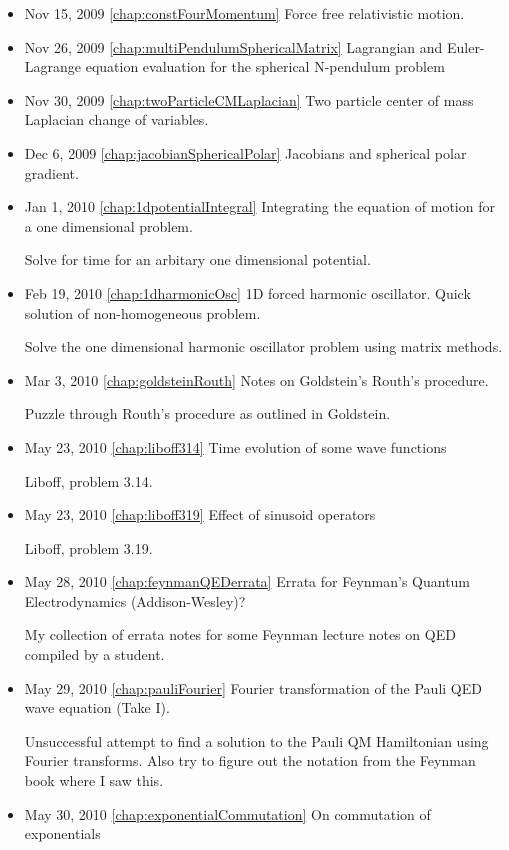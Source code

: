 \begin{itemize}
\item Nov 15, 2009 \ref{chap:constFourMomentum} Force free relativistic motion.

\item Nov 26, 2009 \ref{chap:multiPendulumSphericalMatrix} Lagrangian and Euler-Lagrange equation evaluation for the spherical N-pendulum problem

\item Nov 30, 2009 \ref{chap:twoParticleCMLaplacian} Two particle center of mass Laplacian change of variables.

\item Dec 6, 2009 \ref{chap:jacobianSphericalPolar} Jacobians and spherical polar gradient.

\item Jan 1, 2010 \ref{chap:1dpotentialIntegral} Integrating the equation of motion for a one dimensional problem.

Solve for time for an arbitary one dimensional potential.\item Feb 19, 2010 \ref{chap:1dharmonicOsc} 1D forced harmonic oscillator.  Quick solution of non-homogeneous problem.

Solve the one dimensional harmonic oscillator problem using matrix methods.\item Mar 3, 2010 \ref{chap:goldsteinRouth} Notes on Goldstein's Routh's procedure.

Puzzle through Routh's procedure as outlined in Goldstein.\item May 23, 2010 \ref{chap:liboff314} Time evolution of some wave functions

Liboff, problem 3.14.\item May 23, 2010 \ref{chap:liboff319} Effect of sinusoid operators

Liboff, problem 3.19.\item May 28, 2010 \ref{chap:feynmanQEDerrata} Errata for Feynman's Quantum Electrodynamics (Addison-Wesley)?

My collection of errata notes for some Feynman lecture notes on QED compiled by a student.\item May 29, 2010 \ref{chap:pauliFourier} Fourier transformation of the Pauli QED wave equation (Take I).

Unsuccessful attempt to find a solution to the Pauli QM Hamiltonian using Fourier transforms.  Also try to figure out the notation from the Feynman book where I saw this.\item May 30, 2010 \ref{chap:exponentialCommutation} On commutation of exponentials


\end{itemize}
